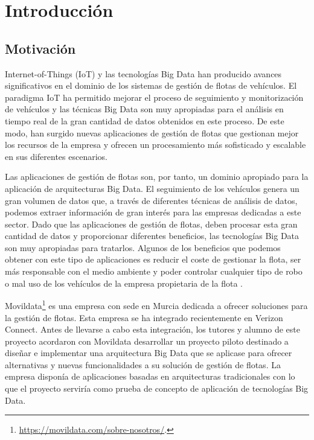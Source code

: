 
\chapter{Introducción\label{intro}}

\section{Motivación\label{motivacion}}

Internet-of-Things (IoT) y las tecnologías Big Data han producido
avances significativos en el dominio de los sistemas de gestión de
flotas de vehículos. El paradigma IoT ha permitido mejorar el proceso
de seguimiento y monitorización de vehículos y las técnicas Big Data
son muy apropiadas para el análisis en tiempo real de la gran cantidad
de datos obtenidos en este proceso\cite{1-1-3}. De este modo, han
surgido nuevas aplicaciones de gestión de flotas que gestionan mejor
los recursos de la empresa y ofrecen un procesamiento más sofisticado
y escalable en sus diferentes escenarios.


Las aplicaciones de gestión de flotas son, por tanto, un dominio
apropiado para la aplicación de arquitecturas Big Data. El seguimiento
de los vehículos genera un gran volumen de datos que, a través de
diferentes técnicas de análisis de datos, podemos extraer información
de gran interés para las empresas dedicadas a este sector. Dado que
las aplicaciones de gestión de flotas, deben procesar esta gran
cantidad de datos y proporcionar diferentes beneficios, las
tecnologías Big Data son muy apropiadas para tratarlos. Algunos de los
beneficios que podemos obtener con este tipo de aplicaciones es
reducir el coste de gestionar la flota, ser más responsable con el
medio ambiente y poder controlar cualquier tipo de robo o mal uso de
los vehículos de la empresa propietaria de la flota \cite{1-1-1,1-1-2}.

Movildata\footnote{\url{https://movildata.com/sobre-nosotros/}.} es
una empresa con sede en Murcia dedicada a ofrecer soluciones para la
gestión de flotas. Esta empresa se ha integrado recientemente en
Verizon Connect. Antes de llevarse a cabo esta integración, los
tutores y alumno de este proyecto acordaron con Movildata desarrollar
un proyecto piloto destinado a diseñar e implementar una arquitectura
Big Data que se aplicase para ofrecer alternativas y nuevas
funcionalidades a su solución de gestión de flotas. La empresa
disponía de aplicaciones basadas en arquitecturas tradicionales con lo
que el proyecto serviría como prueba de concepto de aplicación de
tecnologías Big Data.

